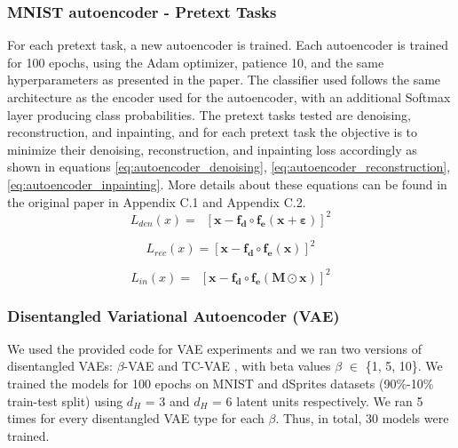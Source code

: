 \subsubsection{MNIST autoencoder - Pretext Tasks} 
For each pretext task, a new autoencoder is trained. Each autoencoder is trained for 100 epochs, using the Adam optimizer, patience 10, and the same hyperparameters as presented in the paper. The classifier used follows the same architecture as the encoder used for the autoencoder, with an additional Softmax layer producing class probabilities. The pretext tasks tested are denoising, reconstruction, and inpainting, and for each pretext task the objective is to minimize their denoising, reconstruction, and inpainting loss accordingly as shown in equations \ref{eq:autoencoder_denoising}, \ref{eq:autoencoder_reconstruction}, \ref{eq:autoencoder_inpainting}. More details about these equations can be found in the original paper in Appendix C.1 and Appendix C.2.
\\

\begin{equation}\label{eq:autoencoder_denoising}
    L_{den}(x)=\mathop{\mathbb{E}_{\varepsilon}} [\mathbf{x} - \mathbf{f_{d}} \circ \mathbf{f_{e}(x + \varepsilon)} ] ^ {2}
\end{equation}

\begin{equation}\label{eq:autoencoder_reconstruction}
    L_{rec}(x)=[\mathbf{x} - \mathbf{f_{d}} \circ \mathbf{f_{e}(x)} ] ^ {2}
\end{equation}

\begin{equation}\label{eq:autoencoder_inpainting}
    L_{in}(x)=\mathop{\mathbb{E}_{M}} [\mathbf{x} - \mathbf{f_{d}} \circ \mathbf{f_{e}(M \odot x)} ] ^ {2}
\end{equation}

\subsubsection{Disentangled Variational Autoencoder (VAE)}
We used the provided code for VAE experiments and we ran two versions of disentangled VAEs: $\beta$-VAE \citep{betavae} and TC-VAE \citep{tcvae}, with beta values $\beta$ $\in$ \{1, 5, 10\}. We trained the models for 100 epochs on MNIST and dSprites datasets (90\%-10\% train-test split) using $d_H$ = 3 and $d_H$ = 6 latent units respectively. We ran 5 times for every disentangled VAE type for each $\beta$. Thus, in total, 30 models were trained.


